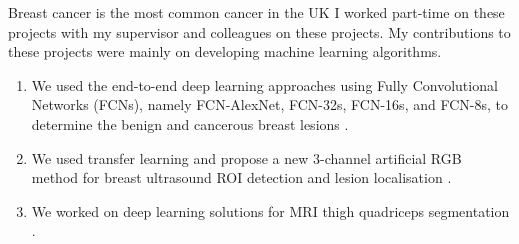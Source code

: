 \documentclass[10pt,a4paper]{article} %
\begin{document}
	
	
	
	
	
	
	
	
	\inlineheadsection 
	{Breast cancer is the most common cancer in the UK} {I worked part-time on these projects with my supervisor and colleagues on these projects. My contributions to these projects were mainly on developing machine learning algorithms.} 
	
	\begin{enumerate}
		\item We used the end-to-end deep learning approaches using Fully Convolutional Networks (FCNs), namely FCN-AlexNet, FCN-32s, FCN-16s, and FCN-8s, to determine the benign and cancerous breast lesions \cite{yap2018end, yap2018breast}.
		\item We used transfer learning and propose a new 3-channel artificial RGB method for breast ultrasound ROI detection and lesion localisation \cite{yap2020breast}. 
		\item We worked on deep learning solutions for MRI thigh quadriceps segmentation \cite{shaubari2018automatic}.
	\end{enumerate}    
	
	
	\spacedhrule{-0.4em}{-0.6em}%
	
	
	
	
	\spacedhrule{0.6em}{-0.6em}%
	
\end{document}
